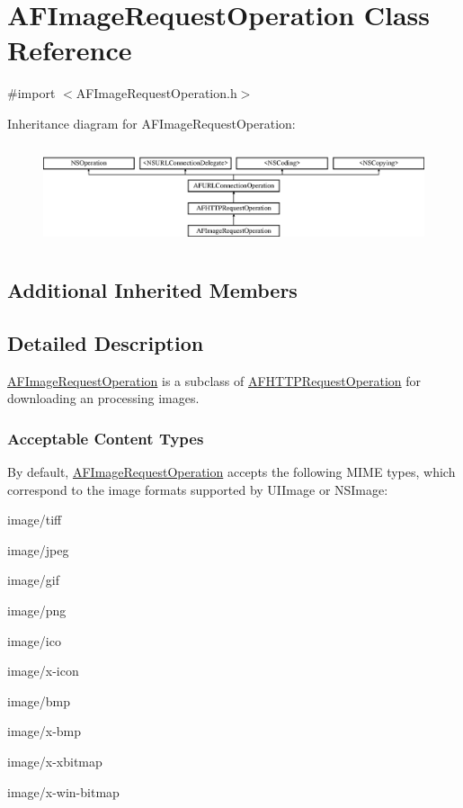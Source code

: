 \hypertarget{interface_a_f_image_request_operation}{\section{A\-F\-Image\-Request\-Operation Class Reference}
\label{interface_a_f_image_request_operation}
}


{\ttfamily \#import $<$A\-F\-Image\-Request\-Operation.\-h$>$}

Inheritance diagram for A\-F\-Image\-Request\-Operation\-:\begin{figure}[H]
\begin{center}
\leavevmode
\includegraphics[height=2.978724cm]{interface_a_f_image_request_operation}
\end{center}
\end{figure}
\subsection*{Additional Inherited Members}


\subsection{Detailed Description}
{\ttfamily \hyperlink{interface_a_f_image_request_operation}{A\-F\-Image\-Request\-Operation}} is a subclass of {\ttfamily \hyperlink{interface_a_f_h_t_t_p_request_operation}{A\-F\-H\-T\-T\-P\-Request\-Operation}} for downloading an processing images.

\subsubsection*{Acceptable Content Types}

By default, {\ttfamily \hyperlink{interface_a_f_image_request_operation}{A\-F\-Image\-Request\-Operation}} accepts the following M\-I\-M\-E types, which correspond to the image formats supported by U\-I\-Image or N\-S\-Image\-:


\begin{DoxyItemize}
\item {\ttfamily image/tiff}
\item {\ttfamily image/jpeg}
\item {\ttfamily image/gif}
\item {\ttfamily image/png}
\item {\ttfamily image/ico}
\item {\ttfamily image/x-\/icon}
\item {\ttfamily image/bmp}
\item {\ttfamily image/x-\/bmp}
\item {\ttfamily image/x-\/xbitmap}
\item {\ttfamily image/x-\/win-\/bitmap} 
\end{DoxyItemize}

